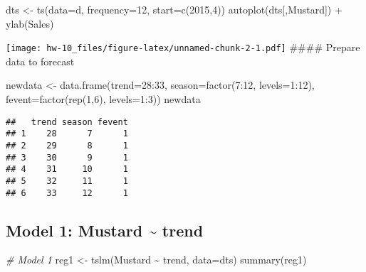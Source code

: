 \documentclass[
]{article}
\newenvironment{Shaded}{\begin{snugshade}}{\end{snugshade}}
\newcommand{\AttributeTok}[1]{\textcolor[rgb]{0.77,0.63,0.00}{#1}}
\newcommand{\CommentTok}[1]{\textcolor[rgb]{0.56,0.35,0.01}{\textit{#1}}}
\newcommand{\DecValTok}[1]{\textcolor[rgb]{0.00,0.00,0.81}{#1}}
\newcommand{\FunctionTok}[1]{\textcolor[rgb]{0.00,0.00,0.00}{#1}}
\newcommand{\NormalTok}[1]{#1}
\newcommand{\OtherTok}[1]{\textcolor[rgb]{0.56,0.35,0.01}{#1}}
\newcommand{\SpecialCharTok}[1]{\textcolor[rgb]{0.00,0.00,0.00}{#1}}
\newcommand{\StringTok}[1]{\textcolor[rgb]{0.31,0.60,0.02}{#1}}
\begin{document}
\begin{Shaded}
\begin{Highlighting}[]
\NormalTok{dts }\OtherTok{\textless{}{-}} \FunctionTok{ts}\NormalTok{(}\AttributeTok{data=}\NormalTok{d, }\AttributeTok{frequency=}\DecValTok{12}\NormalTok{, }\AttributeTok{start=}\FunctionTok{c}\NormalTok{(}\DecValTok{2015}\NormalTok{,}\DecValTok{4}\NormalTok{))}
\FunctionTok{autoplot}\NormalTok{(dts[,}\StringTok{\textquotesingle{}Mustard\textquotesingle{}}\NormalTok{]) }\SpecialCharTok{+}
  \FunctionTok{ylab}\NormalTok{(}\StringTok{\textquotesingle{}Sales\textquotesingle{}}\NormalTok{)}
\end{Highlighting}
\end{Shaded}

\texttt{[image: hw-10\_files/figure-latex/unnamed-chunk-2-1.pdf]}
\#\#\#\# Prepare data to forecast

\begin{Shaded}
\begin{Highlighting}[]
\NormalTok{newdata }\OtherTok{\textless{}{-}} \FunctionTok{data.frame}\NormalTok{(}\AttributeTok{trend=}\DecValTok{28}\SpecialCharTok{:}\DecValTok{33}\NormalTok{, }
                      \AttributeTok{season=}\FunctionTok{factor}\NormalTok{(}\DecValTok{7}\SpecialCharTok{:}\DecValTok{12}\NormalTok{, }\AttributeTok{levels=}\DecValTok{1}\SpecialCharTok{:}\DecValTok{12}\NormalTok{),}
                      \AttributeTok{fevent=}\FunctionTok{factor}\NormalTok{(}\FunctionTok{rep}\NormalTok{(}\DecValTok{1}\NormalTok{,}\DecValTok{6}\NormalTok{), }\AttributeTok{levels=}\DecValTok{1}\SpecialCharTok{:}\DecValTok{3}\NormalTok{))}
\NormalTok{newdata}
\end{Highlighting}
\end{Shaded}

\begin{verbatim}
##   trend season fevent
## 1    28      7      1
## 2    29      8      1
## 3    30      9      1
## 4    31     10      1
## 5    32     11      1
## 6    33     12      1
\end{verbatim}

\hypertarget{model-1-mustard-trend}{%
\subsection{Model 1: Mustard \textasciitilde{}
trend}\label{model-1-mustard-trend}}

\begin{Shaded}
\begin{Highlighting}[]
\CommentTok{\# Model 1}
\NormalTok{reg1 }\OtherTok{\textless{}{-}} \FunctionTok{tslm}\NormalTok{(Mustard }\SpecialCharTok{\textasciitilde{}}\NormalTok{ trend, }\AttributeTok{data=}\NormalTok{dts)}
\FunctionTok{summary}\NormalTok{(reg1)}
\end{Highlighting}
\end{Shaded}
\end{document}

